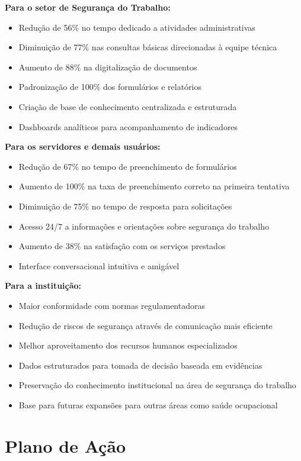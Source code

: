 \documentclass[12pt,a4paper]{article}
\begin{document}
\textbf{Para o setor de Segurança do Trabalho:}
\begin{itemize}
    \item Redução de 56\% no tempo dedicado a atividades administrativas
    \item Diminuição de 77\% nas consultas básicas direcionadas à equipe técnica
    \item Aumento de 88\% na digitalização de documentos
    \item Padronização de 100\% dos formulários e relatórios
    \item Criação de base de conhecimento centralizada e estruturada
    \item Dashboards analíticos para acompanhamento de indicadores
\end{itemize}

\textbf{Para os servidores e demais usuários:}
\begin{itemize}
    \item Redução de 67\% no tempo de preenchimento de formulários
    \item Aumento de 100\% na taxa de preenchimento correto na primeira tentativa
    \item Diminuição de 75\% no tempo de resposta para solicitações
    \item Acesso 24/7 a informações e orientações sobre segurança do trabalho
    \item Aumento de 38\% na satisfação com os serviços prestados
    \item Interface conversacional intuitiva e amigável
\end{itemize}

\textbf{Para a instituição:}
\begin{itemize}
    \item Maior conformidade com normas regulamentadoras
    \item Redução de riscos de segurança através de comunicação mais eficiente
    \item Melhor aproveitamento dos recursos humanos especializados
    \item Dados estruturados para tomada de decisão baseada em evidências
    \item Preservação do conhecimento institucional na área de segurança do trabalho
    \item Base para futuras expansões para outras áreas como saúde ocupacional
\end{itemize}

\clearpage
\section{Plano de Ação}
\end{document}
